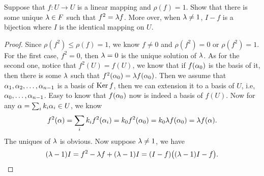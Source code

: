 \begin{pro}%
	Suppose that $f\colon U\to U$ is a linear mapping and $\rho(f)=1$. Show that there is some unique $\lambda\in F$ such that $f^2=\lambda f$. More over, when $\lambda\neq 1$, $I-f$ is a bijection where $I$ is the identical mapping on $U$.
\end{pro}
\begin{proof}
	Since $\rho(f^2)\leq \rho(f)=1$, we know $f\neq 0$ and $\rho(f^2)=0$ or $\rho(f^2)=1$. For the first case, $f^2=0$, then $\lambda=0$ is the unique solution of $\lambda$. As for the second one, notice that $f^2(U)=f(U)$, we know that if $f(\alpha_0)$ is the basis of it, then there is some $\lambda$ such that $f^2(\alpha_0)=\lambda f(\alpha_0)$. Then we assume that $\alpha_1,\alpha_2,\dots,\alpha_{n-1}$ is a basis of $\operatorname*{Ker} f$, then we can extension it to a basis of $U$, i.e, $\alpha_0,\dots, \alpha_{n-1}$. Easy to know that $f(\alpha_0)$ now is indeed a basis of $f(U)$. Now for any $\alpha=\sum_i k_i \alpha_i \in U$, we know
	\[f^2(\alpha)=\sum_i k_i f^2(\alpha_i)=k_0 f^2(\alpha_0)=k_0\lambda f(\alpha_0)=\lambda f(\alpha).\]
	The uniques of $\lambda$ is obvious. Now suppose $\lambda \neq 1$, we have
	\[(\lambda-1)I=f^2-\lambda f+(\lambda-1)I=(I-f)\big((\lambda-1)I-f\big).\]
\end{proof}

